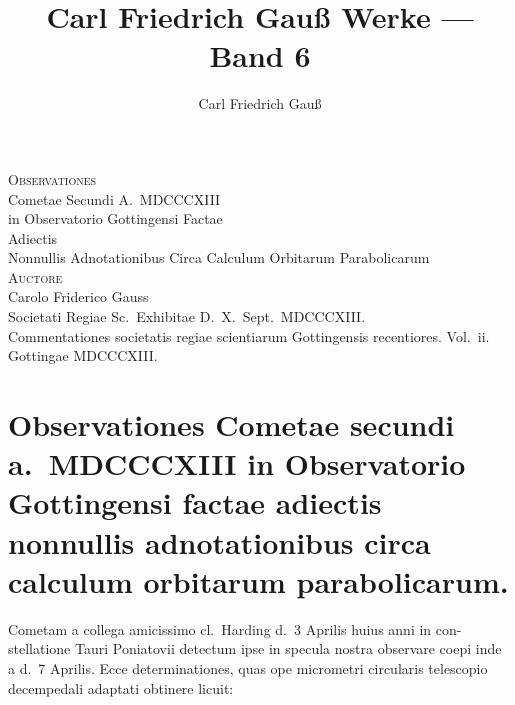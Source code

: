 \documentclass[12pt,a4paper]{article}
\title{Carl Friedrich Gau\ss{} Werke --- Band 6}
\author{Carl Friedrich Gau\ss{}}
\date{}
\begin{document}
\maketitle
\thispagestyle{empty}


\newpage
\thispagestyle{empty}
\begin{center}
\vspace*{2cm}

{\Large\scshape Observationes}\\[0.5em]
{\large Cometae Secundi A.\ MDCCCXIII}\\[0.5em]
{\large in Observatorio Gottingensi Factae}\\[0.5em]
{\large Adiectis}\\[0.5em]
{\large Nonnullis Adnotationibus Circa Calculum Orbitarum Parabolicarum}\\[1.5em]

{\scshape Auctore}\\[0.5em]
{\Large Carolo Friderico Gauss}\\[1em]

{\small Societati Regiae Sc.\ Exhibitae D.\ X.\ Sept.\ MDCCCXIII.}\\[1em]

{\small Commentationes societatis regiae scientiarum Gottingensis recentiores. Vol.~ii.}\\
{\small Gottingae MDCCCXIII.}
\end{center}

\newpage

\section*{Observationes Cometae secundi a.\ MDCCCXIII in Observatorio Gottingensi factae adiectis nonnullis adnotationibus circa calculum orbitarum parabolicarum.}

Cometam a collega amicissimo cl.\ Harding d.\ 3 Aprilis huius anni in con-
stellatione Tauri Poniatovii detectum ipse in specula nostra observare coepi inde
a d.\ 7 Aprilis. Ecce determinationes, quas ope micrometri circularis telescopio
decempedali adaptati obtinere licuit:
\end{document}
